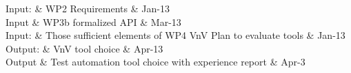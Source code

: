 \documentclass{template/openetcs_article}
\begin{document}

\begin{inoutput}
Input: & WP2 Requirements & Jan-13 \\
Input  & WP3b formalized API & Mar-13 \\ 
Input: & Those sufficient elements of WP4 VnV Plan to evaluate tools & Jan-13 \\
\hline
Output: & VnV tool choice & Apr-13 \\
Output  &  Test automation tool choice with experience report & Apr-3 \\
\end{inoutput}
\end{document}

